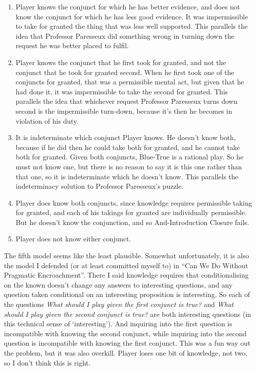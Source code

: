 \documentclass[
  11pt,
]{book}
\providecommand{\tightlist}{%
  \setlength{\itemsep}{0pt}\setlength{\parskip}{0pt}}
\begin{document}
\begin{enumerate}
\def\labelenumi{\arabic{enumi}.}
\tightlist
\item
  Player knows the conjunct for which he has better evidence, and does not know the conjunct for which he has less good evidence. It was impermissible to take for granted the thing that was less well supported. This parallels the idea that Professor Paresseux did something wrong in turning down the request he was better placed to fulfil.
\item
  Player knows the conjunct that he first took for granted, and not the conjunct that he took for granted second. When he first took one of the conjuncts for granted, that was a permissible mental act, but given that he had done it, it was impermissible to take the second for granted. This parallels the idea that whichever request Professor Paresseux turns down second is the impermissible turn-down, because it's then he becomes in violation of his duty.
\item
  It is indeterminate which conjunct Player knows. He doesn't know both, because if he did then he could take both for granted, and he cannot take both for granted. Given both conjuncts, Blue-True is a rational play. So he must not know one, but there is no reason to say it is this one rather than that one, so it is indeterminate which he doesn't know. This parallels the indeterminacy solution to Professor Paresseux's puzzle.
\item
  Player does know both conjuncts, since knowledge requires permissible taking for granted, and each of his takings for granted are individually permissible. But he doesn't know the conjunction, and so And-Introduction Closure fails.
\item
  Player does not know either conjunct.
\end{enumerate}

The fifth model seems like the least plausible. Somewhat unfortunately, it is also the model I defended (or at least committed myself to) in ``Can We Do Without Pragmatic Encroachment''. There I said knowledge requires that conditionalising on the known doesn't change any answers to interesting questions, and any question taken conditional on an interesting proposition is interesting. So each of the questions \emph{What should I play given the first conjunct is true?} and \emph{What should I play given the second conjunct is true?} are both interesting questions (in this technical sense of `interesting'). And inquiring into the first question is incompatible with knowing the second conjunct, while inquiring into the second question is incompatible with knowing the first conjunct. This was a fun way out the problem, but it was also overkill. Player loses one bit of knowledge, not two, so I don't think this is right.
\end{document}
